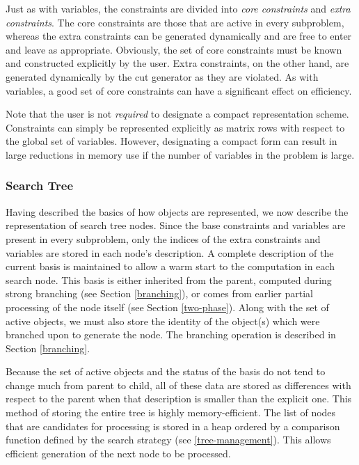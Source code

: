 Just as with variables, the constraints are divided into {\em core
constraints} and {\em extra constraints}. The core constraints are
those that are active in every subproblem, whereas the extra
constraints can be generated dynamically and are free to enter and leave
as appropriate. Obviously, the set of core constraints must be known
and constructed explicitly by the user. Extra constraints, on the
other hand, are generated dynamically by the cut generator as they are
violated. As with variables, a good set of core constraints can have a
significant effect on efficiency.

Note that the user is not {\em required} to designate a compact
representation scheme. Constraints can simply be represented
explicitly as matrix rows with respect to the global set of variables.
However, designating a compact form can result in large reductions in
memory use if the number of variables in the problem is large.

\subsubsection{Search Tree}

Having described the basics of how objects are represented, we now
describe the representation of search tree nodes. Since the base
constraints and variables are present in every subproblem, only the
indices of the extra constraints and variables are stored in each
node's description. A complete description of the current basis is
maintained to allow a warm start to the computation in each search
node. This basis is either inherited from the parent, computed during
strong branching (see Section \ref{branching}), or comes from earlier
partial processing of the node itself (see Section \ref{two-phase}).
Along with the set of active objects, we must also store the identity
of the object(s) which were branched upon to generate the node. The
branching operation is described in Section \ref{branching}.

Because the set of active objects and the status of the basis do not
tend to change much from parent to child, all of these data are stored
as differences with respect to the parent when that description is
smaller than the explicit one. This method of storing the entire tree
is highly memory-efficient. The list of nodes that are candidates for
processing is stored in a heap ordered by a comparison function
defined by the search strategy (see \ref{tree-management}). This
allows efficient generation of the next node to be processed.

